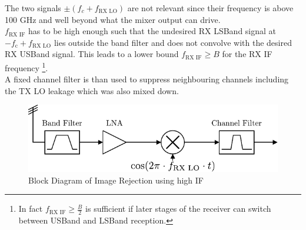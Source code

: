 The two signals $\pm (f_{c} + f_{\text{RX LO}})$ are not relevant since their
frequency is above 100 GHz and well beyond what the mixer output can drive. \\

$f_{\text{RX IF}}$ has to be high enough such that the undesired
\gls{RX} \gls{LSBand} signal at $-f_{\text{c}} + f_{\text{RX LO}}$
lies outside the band filter and does not convolve with the desired
\gls{RX} \gls{USBand} signal. This leads to a lower bound
$f_{\text{RX IF}} \geq B$ for the \gls{RX} \gls{IF} frequency
\footnote{%
  In fact $f_{\text{RX IF}} \geq \frac{B}{2}$
  is sufficient if later stages of the receiver can switch
  between \gls{USBand} and \gls{LSBand} reception.}. \\

A fixed channel filter is than used to suppress neighbouring channels
including the \gls{TX} \gls{LO} leakage which was also mixed down. \\

\begin{figure}[h!]
  \centering
  \includegraphics[width=\textwidth]{figures/rx_rf_0_bd}
  \caption{Block Diagram of Image Rejection using high \gls{IF}}
  \label{fig:rx_rf_0_bd}
\end{figure}

